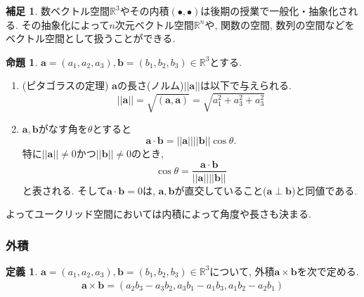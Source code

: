 \documentclass[dvipdfmx,a4paper,11pt]{article} %
\newcommand{\R}{\mathbb{R}}
\theoremstyle{definition}
\newtheorem{prop}[thm]{命題}
\newtheorem{dfn}[thm]{定義}
\newtheorem{rem}[thm]{補足}
\begin{document}
\begin{rem}
数ベクトル空間$\R^3$やその内積$(\bullet, \bullet)$は後期の授業で一般化・抽象化される. 
その抽象化によって$n$次元ベクトル空間$\R^n$や, 関数の空間, 数列の空間などをベクトル空間として扱うことができる. 
\end{rem}

    \begin{prop}
$\bm{a} =(a_1, a_2, a_3), \bm{b}=(b_1, b_2, b_3) \in \R^3$とする.
\begin{enumerate}

\item (ピタゴラスの定理) $\bm{a}$の長さ(ノルム)$||\bm{a}||$は以下で与えられる.
$$
||\bm{a}|| = \sqrt{(\bm{a}, \bm{a})} = \sqrt{a_{1}^{2}+a_{3}^{2}+a_{3}^{2}}
$$
\item \cite[問題 1.1.1]{O} $\bm{a}, \bm{b}$がなす角を$\theta$とすると
$$
\bm{a} \cdot\bm{b} = ||\bm{a} || || \bm{b}|| \cos \theta.
$$
特に$||\bm{a} ||  \neq 0$かつ$|| \bm{b}|| \neq0$のとき, 
$$
 \cos \theta  = \frac{\bm{a} \cdot\bm{b}}{||\bm{a} || || \bm{b}||}
$$
と表される. 
そして$\bm{a} \cdot\bm{b} =0$は, $\bm{a}, \bm{b}$が直交していること($\bm{a}\perp\bm{b}$)と同値である.
\end{enumerate}
よってユークリッド空間においては内積によって角度や長さも決まる. 
\end{prop}



 \subsubsection{外積}
    \begin{dfn}
$\bm{a}=(a_1, a_2, a_3), \bm{b}=(b_1, b_2, b_3)\in \R^3$について, 外積$\bm{a} \times \bm{b}$を次で定める. 
\begin{align*}
\bm{a} \times \bm{b} 
=
( a_2b_3 - a_3b_2, a_3b_1-a_1b_3, a_1b_2-a_2b_1)  
\end{align*}
\end{dfn}
\end{document}
